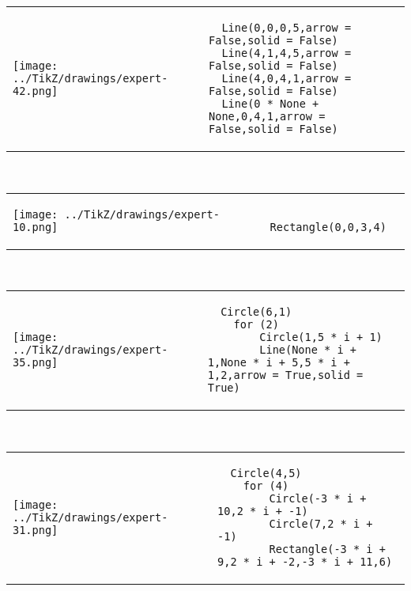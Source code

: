         \begin{tabular}{ll}
\texttt{[image: ../TikZ/drawings/expert-42.png]}&
        \begin{minipage}{10cm}
        \begin{verbatim}
  Line(0,0,0,5,arrow = False,solid = False)
  Line(4,1,4,5,arrow = False,solid = False)
  Line(4,0,4,1,arrow = False,solid = False)
  Line(0 * None + None,0,4,1,arrow = False,solid = False)
        \end{verbatim}
\end{minipage}
\end{tabular}        
        \\

        \begin{tabular}{ll}
\texttt{[image: ../TikZ/drawings/expert-10.png]}&
        \begin{minipage}{10cm}
        \begin{verbatim}
  Rectangle(0,0,3,4)
        \end{verbatim}
\end{minipage}
\end{tabular}        
        \\

        \begin{tabular}{ll}
\texttt{[image: ../TikZ/drawings/expert-35.png]}&
        \begin{minipage}{10cm}
        \begin{verbatim}
  Circle(6,1)
    for (2)
        Circle(1,5 * i + 1)
        Line(None * i + 1,None * i + 5,5 * i + 1,2,arrow = True,solid = True)
        \end{verbatim}
\end{minipage}
\end{tabular}        
        \\

        \begin{tabular}{ll}
\texttt{[image: ../TikZ/drawings/expert-31.png]}&
        \begin{minipage}{10cm}
        \begin{verbatim}
  Circle(4,5)
    for (4)
        Circle(-3 * i + 10,2 * i + -1)
        Circle(7,2 * i + -1)
        Rectangle(-3 * i + 9,2 * i + -2,-3 * i + 11,6)
        \end{verbatim}
\end{minipage}
\end{tabular}        
        \\

